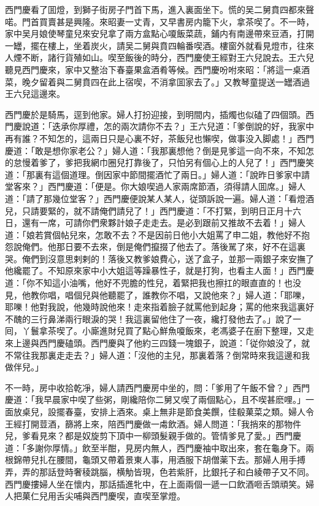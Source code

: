 西門慶看了囬燈，到獅子街房子門首下馬，進入裏面坐下。慌的吴二舅賁四都來聲喏。門首買賣甚是興隆。來昭妻一丈青，又早書房内籠下火，拿茶喫了。不一時，家中吴月娘使琴童兒來安兒拿了兩方盒點心嗄飯菜蔬，鋪内有南邊帶來豆酒，打開一罎，擺在樓上，坐着炭火，請吴二舅與賁四輪番喫酒。樓窗外就看見燈巿，往來人煙不断，諸行貨殖如山。喫至飯後的時分，西門慶使王經對王六兒說去。王六兒聽見西門慶來，家中又整治下春臺果盒酒肴等候。西門慶吩咐來昭：「將這一桌酒菜，晚夕留着與二舅賁四在此上宿喫，不消拿囬家去了。」又教琴童提送一罎酒過王六兒這邊來。

西門慶於是騎馬，逕到他家。婦人打扮迎接，到明間内，插燭也似磕了四個頭。西門慶說道：「迭承你厚禮，怎的兩次請你不去？」王六兒道：「爹倒說的好，我家中再有誰？不知怎的，這兩日只是心裏不好，茶飯兒也懶喫，做事没入脚處！」西門慶道：「敢是想你家老公？」婦人道：「我那裏想他？倒是見爹這一向不來，不知怎的怠慢着爹了，爹把我網巾圈兒打靠後了，只怕另有個心上的人兒了！」西門慶笑道：「那裏有這個道理。倒因家中節間擺酒忙了兩日。」婦人道：「說昨日爹家中請堂客來？」西門慶道：「便是。你大娘喫過人家兩席節酒，須得請人囬席。」婦人道：「請了那幾位堂客？」西門慶便說某人某人，従頭訴說一遍。婦人道：「看燈酒兒，只請要緊的，就不請俺們請兒了！」西門慶道：「不打緊，到明日正月十六日，還有一席，可請你們衆夥計娘子走走去。是必到跟前又推故不去着！」婦人道：「娘若賞個帖兒來，怎敢不去？不是因前日他小大姐罵了申二姐，教他好不抱怨說俺們。他那日要不去來，倒是俺們攛掇了他去了。落後駡了來，好不在這裏哭。俺們到沒意思剌剌的！落後又教爹娘費心，送了盒子，並那一兩銀子來安撫了他纔罷了。不知原來家中小大姐這等躁暴性子，就是打狗，也看主人面！」西門慶道：「你不知這小油嘴，他好不兜膽的性兒，着緊把我也擦扛的眼直直的！也没見，他教你唱，唱個兒與他聽罷了，誰教你不唱，又說他來？」婦人道：「耶嚛，耶嚛！他對我說，他幾時說他來！走來指着臉子就罵他到起身；罵的他來我這裏好不醜的三行鼻涕兩行眼淚的哭！我這裏留他住了一夜，纔打發他去了。」說了一囘，丫鬟拿茶喫了。小廝進財兒買了點心鮮魚嗄飯來，老馮婆子在廚下整理，又走來上邊與西門慶磕頭。西門慶與了他約三四錢一塊銀子，說道：「従你娘没了，就不常往我那裏走走去？」婦人道：「沒他的主兒，那裏着落？倒常時來我這邊和我做伴兒。」

不一時，房中收拾乾凈，婦人請西門慶房中坐的，問：「爹用了午飯不曾？」西門慶道：「我早晨家中喫了些粥，剛纔陪你二舅又喫了兩個點心，且不喫甚麽哩。」一面放桌兒，設擺春臺，安排上酒來。桌上無非是節食美饌，佳殽菓菜之類。婦人令王經打開荳酒，篩將上來，陪西門慶做一䖏飲酒。婦人問道：「我捎來的那物件兒，爹看見來？都是奴旋剪下頂中一柳頭髮親手做的。管情爹見了愛。」西門慶道：「多謝你厚情。」飲至半酣，見房内無人，西門慶袖中取出來，套在龜身下。兩根錦帶兒扎在腰間，龜頭又帶着景東人事，用酒服下胡僧薬下去。那婦人用手搏弄，弄的那話登時奢稜跳腦，横觔皆現，色若紫肝，比銀托子和白綾帶子又不同。西門慶摟婦人坐在懷内，那話插進牝中，在上面兩個一遞一口飲酒咂舌頭頑笑。婦人把菓仁兒用舌尖哺與西門慶喫，直喫至掌燈。

